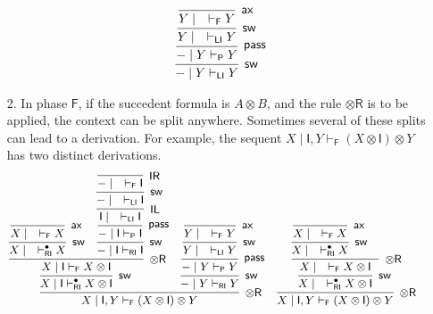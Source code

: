 \documentclass[copyright,creativecommons]{eptcs}
\theoremstyle{definition}
\newcommand{\tr}{\otimes \mathsf{R}}
\newcommand{\pass}{\mathsf{pass}}
\newcommand{\unitl}{\mathsf{IL}}
\newcommand{\unitr}{\mathsf{IR}}
\newcommand{\ax}{\mathsf{ax}}
\newcommand{\ot}{\otimes}
\newcommand{\I}{\mathsf{I}}
\newcommand{\RI}{\mathsf{RI}}
\newcommand{\LI}{\mathsf{LI}}
\newcommand{\Pass}{\mathsf{P}}
\newcommand{\F}{\mathsf{F}}
\begin{document}
\begin{enumerate}
\begin{equation*}
\begin{array}{cc}
{{{{{{{{                    \infer[\mathsf{sw}]{{-} \mid Y \vdash_{\LI} Y}{
                      \infer[\pass]{{-} \mid Y \vdash_{\Pass} Y}{
                        \infer[\mathsf{sw}]{Y \mid \quad \vdash_{\LI} Y}{
                          \infer[\ax]{Y \mid \quad \vdash_{\F} Y}{}
                        }
                      }
                    }
                  }
                }
              }
            }
          }
        }
      }
    }
    \end{array}
    \normalsize
  \end{equation*}
  \item[2.] In phase $\F$, if the succedent formula is $A \ot B$, and the rule $\tr$ is to be applied, the context can be split anywhere. Sometimes
several of these splits can lead to a derivation.
  For example, the sequent $X \mid \I , Y \vdash_{\F} (X \ot \I) \ot Y$ has two distinct derivations.
  \begin{equation*}
\hspace*{-5mm}
  \small
    \begin{array}{cc}
      \infer[\tr]{X \mid \I , Y \vdash_{\F} (X \ot \I) \ot Y}{
       \infer[\mathsf{sw}]{X \mid \I \vdash^{\bullet}_{\RI} X \ot \I}{
         \infer[\tr]{X \mid \I \vdash_{\F} X \ot \I}{
           \infer[\mathsf{sw}]{X \mid \quad \vdash^{\bullet}_{\RI} X}{
             \infer[\ax]{X \mid \quad \vdash_{\F} X}{}
           }
           &
           \infer[\mathsf{sw}]{{-} \mid \I \vdash_{\RI} \I}{
             \infer[\pass]{{-} \mid \I \vdash_{\Pass} \I}{
               \infer[\unitl]{\I \mid \quad \vdash_{\LI} \I}{
                 \infer[\mathsf{sw}]{{-} \mid \quad \vdash_{\LI} \I}{
                   \infer[\unitr]{{-} \mid \quad \vdash_{\F} \I}{}
                 }
               }
             }
           }
         }
       }
       &
       \infer[\mathsf{sw}]{{-} \mid Y \vdash_{\RI} Y}{
         \infer[\pass]{{-} \mid Y \vdash_{\Pass} Y}{
           \infer[\mathsf{sw}]{Y \mid \quad \vdash_{\LI} Y}{
             \infer[\ax]{Y \mid \quad \vdash_{\F} Y}{}
           }
         }
       }
      }
      &
      \infer[\tr]{X \mid \I , Y \vdash_{\F} (X \ot \I) \ot Y}{
       \infer[\mathsf{sw}]{X \mid \quad \vdash^{\bullet}_{\RI} X \ot \I}{
         \infer[\tr]{X \mid \quad \vdash_{\F} X \ot \I}{
           \infer[\mathsf{sw}]{X \mid \quad \vdash^{\bullet}_{\RI} X}{
             \infer[\ax]{X \mid \quad \vdash_{\F} X}{}
           }
           &
}}}
\end{array}
\end{equation*}
\end{enumerate}
\end{document}
